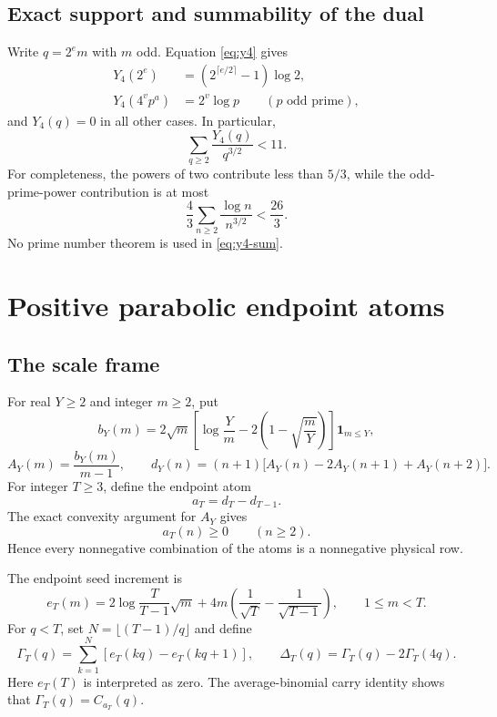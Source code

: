 \documentclass[11pt]{article}
\newcommand{\Yfour}{Y_4}
\newcommand{\one}{\mathbf 1}
\begin{document}
\subsection{Exact support and summability of the dual}

Write $q=2^em$ with $m$ odd. Equation \eqref{eq:y4} gives
\begin{align}
 \Yfour(2^e)&=(2^{\lceil e/2\rceil}-1)\log2,\label{eq:y4-powers2}\\
 \Yfour(4^vp^a)&=2^v\log p\qquad(p\text{ odd prime}),\label{eq:y4-oddpp}
\end{align}
and $\Yfour(q)=0$ in all other cases. In particular,
\begin{equation}
 \boxed{\sum_{q\ge2}\frac{\Yfour(q)}{q^{3/2}}<11.}
 \label{eq:y4-sum}
\end{equation}
For completeness, the powers of two contribute less than $5/3$, while the odd-prime-power contribution is at most
\[
 \frac43\sum_{n\ge2}\frac{\log n}{n^{3/2}}<\frac{26}{3}.
\]
No prime number theorem is used in \eqref{eq:y4-sum}.

\section{Positive parabolic endpoint atoms}

\subsection{The scale frame}

For real $Y\ge2$ and integer $m\ge2$, put
\begin{equation}
 b_Y(m)=2\sqrt m\left[\log\frac Ym-2\left(1-\sqrt{\frac mY}\right)\right]\one_{m\le Y},
 \label{eq:bseed}
\end{equation}
\begin{equation}
 A_Y(m)=\frac{b_Y(m)}{m-1},
 \qquad
 d_Y(n)=(n+1)\bigl[A_Y(n)-2A_Y(n+1)+A_Y(n+2)\bigr].
 \label{eq:dy}
\end{equation}
For integer $T\ge3$, define the endpoint atom
\begin{equation}
 a_T=d_T-d_{T-1}.
 \label{eq:atom}
\end{equation}
The exact convexity argument for $A_Y$ gives
\begin{equation}
 a_T(n)\ge0\qquad(n\ge2).
 \label{eq:atom-positive}
\end{equation}
Hence every nonnegative combination of the atoms is a nonnegative physical row.

The endpoint seed increment is
\begin{equation}
 e_T(m)=2\log\frac{T}{T-1}\sqrt m
 +4m\left(\frac1{\sqrt T}-\frac1{\sqrt{T-1}}\right),
 \qquad 1\le m<T.
 \label{eq:seed-increment}
\end{equation}
For $q<T$, set $N=\lfloor(T-1)/q\rfloor$ and define
\begin{equation}
 \Gamma_T(q)=\sum_{k=1}^{N}[e_T(kq)-e_T(kq+1)],
 \qquad
 \Delta_T(q)=\Gamma_T(q)-2\Gamma_T(4q).
 \label{eq:atom-response}
\end{equation}
Here $e_T(T)$ is interpreted as zero. The average-binomial carry identity shows that $\Gamma_T(q)=C_{a_T}(q)$.
\end{document}

